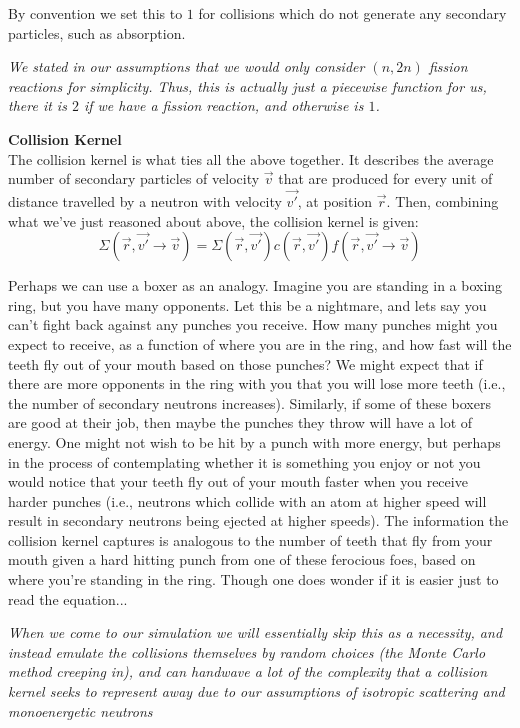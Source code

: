 By convention we set this to $1$ for collisions which do not generate any secondary particles, such as absorption.

\textit{We stated in our assumptions that we would only consider $(n,2n)$ fission reactions for simplicity. Thus, this is 
actually just a piecewise function for us, there it is $2$ if we have a fission reaction, and otherwise is $1$.}

\noindent \textbf{Collision Kernel}\\
The collision kernel is what ties all the above together. It describes the average number of secondary particles of velocity $\vec{v}$ 
that are produced for every unit of distance travelled by a neutron with velocity $\vec{v'}$, at position $\vec{r}$. Then, combining 
what we've just reasoned about above, the collision kernel is given:
$$\Sigma(\vec{r}, \vec{v'} \to \vec{v}) = \Sigma(\vec{r}, \vec{v'}) c(\vec{r}, \vec{v'}) f(\vec{r}, \vec{v'} \to \vec{v})$$

Perhaps we can use a boxer as an analogy. Imagine you are standing in a boxing ring, but you have many opponents. Let this be a 
nightmare, and lets say you can't fight back against any punches you receive. How many punches might you expect to receive, 
as a function of where you are in the ring, and how fast will the teeth fly out of your mouth based on those punches? We might expect 
that if there are more opponents in the ring with you that you will lose more teeth (i.e., the number of secondary neutrons 
increases). Similarly, if some of these boxers are good at their job, then maybe the punches they throw will have a lot of energy. 
One might not wish to be hit by a punch with more energy, but perhaps in the process of contemplating whether it is something 
you enjoy or not you would notice that your teeth fly out of your mouth faster when you receive harder punches (i.e., 
neutrons which collide with an atom at higher speed will result in secondary neutrons being ejected at higher speeds). The
information the collision kernel captures is analogous to the number of teeth that fly from your mouth given a hard hitting 
punch from one of these ferocious foes, based on where you're standing in the ring. Though one does wonder if it is easier just 
to read the equation... 

\textit{When we come to our simulation we will essentially skip this as a necessity, and instead emulate the collisions themselves 
by random choices (the Monte Carlo method creeping in), and can handwave a lot of the complexity that a collision kernel 
seeks to represent away due to our assumptions of isotropic scattering and monoenergetic neutrons}

